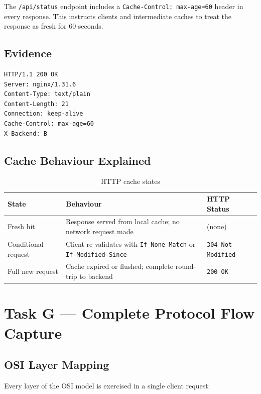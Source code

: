 \documentclass[12pt,a4paper]{article}
\begin{document}
The \texttt{/api/status} endpoint includes a \texttt{Cache-Control: max-age=60} header in every response. This instructs clients and intermediate caches to treat the response as fresh for 60 seconds.

\subsection{Evidence}

\begin{lstlisting}[caption=curl -sI https://api.NAN.test/api/status]
HTTP/1.1 200 OK
Server: nginx/1.31.6
Content-Type: text/plain
Content-Length: 21
Connection: keep-alive
Cache-Control: max-age=60
X-Backend: B
\end{lstlisting}

\subsection{Cache Behaviour Explained}

\begin{table}[h!]
\centering
\caption{HTTP cache states}
\begin{tabular}{lp{5.5cm}l}
\toprule
\textbf{State} & \textbf{Behaviour} & \textbf{HTTP Status} \\
\midrule
Fresh hit & Response served from local cache; no network request made & (none) \\
Conditional request & Client re-validates with \texttt{If-None-Match} or \texttt{If-Modified-Since} & \texttt{304 Not Modified} \\
Full new request & Cache expired or flushed; complete round-trip to backend & \texttt{200 OK} \\
\bottomrule
\end{tabular}
\end{table}

\section{Task G --- Complete Protocol Flow Capture}

\subsection{OSI Layer Mapping}

Every layer of the OSI model is exercised in a single client request:
\end{document}
